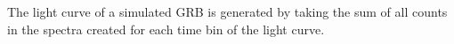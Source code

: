 \documentclass[linenumbers,twocolumn]{aastex631}
\begin{document}
The light curve of a simulated GRB is generated by taking the sum of all counts in the spectra created for each time bin of the light curve. 






\newpage


\end{document}
